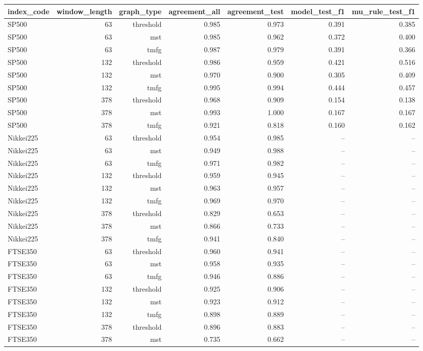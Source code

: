 \begin{tabular}{lrrrrrr}
\toprule
index\_code & window\_length & graph\_type & agreement\_all & agreement\_test & model\_test\_f1 & mu\_rule\_test\_f1 \\
\midrule
SP500 & 63 & threshold & 0.985 & 0.973 & 0.391 & 0.385 \\
SP500 & 63 & mst & 0.985 & 0.962 & 0.372 & 0.400 \\
SP500 & 63 & tmfg & 0.987 & 0.979 & 0.391 & 0.366 \\
SP500 & 132 & threshold & 0.986 & 0.959 & 0.421 & 0.516 \\
SP500 & 132 & mst & 0.970 & 0.900 & 0.305 & 0.409 \\
SP500 & 132 & tmfg & 0.995 & 0.994 & 0.444 & 0.457 \\
SP500 & 378 & threshold & 0.968 & 0.909 & 0.154 & 0.138 \\
SP500 & 378 & mst & 0.993 & 1.000 & 0.167 & 0.167 \\
SP500 & 378 & tmfg & 0.921 & 0.818 & 0.160 & 0.162 \\
Nikkei225 & 63 & threshold & 0.954 & 0.985 & -- & -- \\
Nikkei225 & 63 & mst & 0.949 & 0.988 & -- & -- \\
Nikkei225 & 63 & tmfg & 0.971 & 0.982 & -- & -- \\
Nikkei225 & 132 & threshold & 0.959 & 0.945 & -- & -- \\
Nikkei225 & 132 & mst & 0.963 & 0.957 & -- & -- \\
Nikkei225 & 132 & tmfg & 0.969 & 0.970 & -- & -- \\
Nikkei225 & 378 & threshold & 0.829 & 0.653 & -- & -- \\
Nikkei225 & 378 & mst & 0.866 & 0.733 & -- & -- \\
Nikkei225 & 378 & tmfg & 0.941 & 0.840 & -- & -- \\
FTSE350 & 63 & threshold & 0.960 & 0.941 & -- & -- \\
FTSE350 & 63 & mst & 0.958 & 0.935 & -- & -- \\
FTSE350 & 63 & tmfg & 0.946 & 0.886 & -- & -- \\
FTSE350 & 132 & threshold & 0.925 & 0.906 & -- & -- \\
FTSE350 & 132 & mst & 0.923 & 0.912 & -- & -- \\
FTSE350 & 132 & tmfg & 0.898 & 0.889 & -- & -- \\
FTSE350 & 378 & threshold & 0.896 & 0.883 & -- & -- \\
FTSE350 & 378 & mst & 0.735 & 0.662 & -- & -- \\

\end{tabular}
